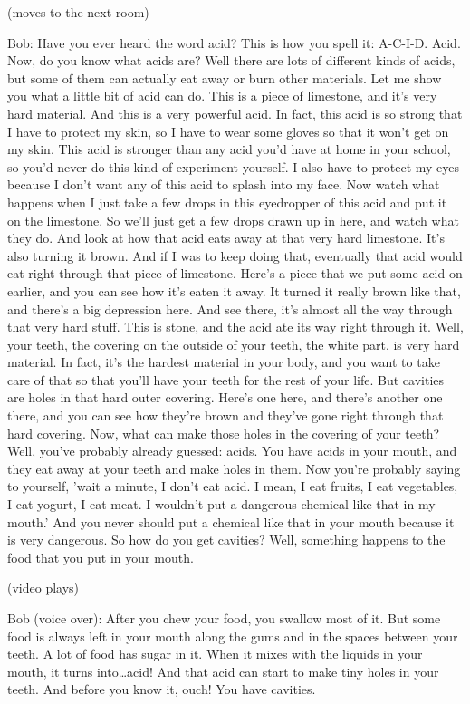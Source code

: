 (moves to the next room)

Bob: Have you ever heard the word acid? This is how you spell it: A-C-I-D. Acid. Now, do you know what acids are? Well there are lots of different kinds of acids, but some of them can actually eat away or burn other materials. Let me show you what a little bit of acid can do. This is a piece of limestone, and it's very hard material. And this is a very powerful acid. In fact, this acid is so strong that I have to protect my skin, so I have to wear some gloves so that it won't get on my skin. This acid is stronger than any acid you'd have at home in your school, so you'd never do this kind of experiment yourself. I also have to protect my eyes because I don't want any of this acid to splash into my face. Now watch what happens when I just take a few drops in this eyedropper of this acid and put it on the limestone. So we'll just get a few drops drawn up in here, and watch what they do. And look at how that acid eats away at that very hard limestone. It's also turning it brown. And if I was to keep doing that, eventually that acid would eat right through that piece of limestone. Here's a piece that we put some acid on earlier, and you can see how it's eaten it away. It turned it really brown like that, and there's a big depression here. And see there, it's almost all the way through that very hard stuff. This is stone, and the acid ate its way right through it. Well, your teeth, the covering on the outside of your teeth, the white part, is very hard material. In fact, it's the hardest material in your body, and you want to take care of that so that you'll have your teeth for the rest of your life. But cavities are holes in that hard outer covering. Here's one here, and there's another one there, and you can see how they're brown and they've gone right through that hard covering. Now, what can make those holes in the covering of your teeth? Well, you've probably already guessed: acids. You have acids in your mouth, and they eat away at your teeth and make holes in them. Now you're probably saying to yourself, 'wait a minute, I don't eat acid. I mean, I eat fruits, I eat vegetables, I eat yogurt, I eat meat. I wouldn't put a dangerous chemical like that in my mouth.' And you never should put a chemical like that in your mouth because it is very dangerous. So how do you get cavities? Well, something happens to the food that you put in your mouth.

(video plays)

Bob (voice over): After you chew your food, you swallow most of it. But some food is always left in your mouth along the gums and in the spaces between your teeth. A lot of food has sugar in it. When it mixes with the liquids in your mouth, it turns into\dots acid! And that acid can start to make tiny holes in your teeth. And before you know it, ouch! You have cavities.

